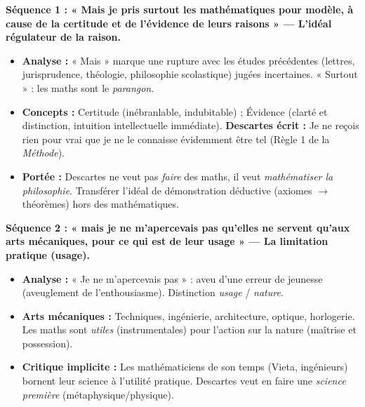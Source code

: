 \documentclass[11pt]{article}
\newcommand{\cle}[1]{{\popxbold\color{popdark}#1}}
\begin{document}
\begin{exoresolu}
    \textbf{Séquence 1 : « Mais je pris surtout les mathématiques pour modèle, à cause de la certitude et de l'évidence de leurs raisons » — L'idéal régulateur de la raison.}
    \begin{itemize}
        \item \textbf{Analyse :} « Mais » marque une rupture avec les études précédentes (lettres, jurisprudence, théologie, philosophie scolastique) jugées incertaines. « Surtout » : les maths sont le \emph{parangon}.
        \item \textbf{Concepts :} \cle{Certitude} (inébranlable, indubitable) ; \cle{Évidence} (clarté et distinction, intuition intellectuelle immédiate). \textbf{Descartes écrit :} \guillemotleft Je ne reçois rien pour vrai que je ne le connaisse évidemment être tel \guillemotright (Règle 1 de la \emph{Méthode}).
        \item \textbf{Portée :} Descartes ne veut pas \emph{faire} des maths, il veut \emph{mathématiser la philosophie}. Transférer l'idéal de démonstration déductive (axiomes $\rightarrow$ théorèmes) hors des mathématiques.
    \end{itemize}

    \textbf{Séquence 2 : « mais je ne m'apercevais pas qu'elles ne servent qu'aux arts mécaniques, pour ce qui est de leur usage » — La limitation pratique (usage).}
    \begin{itemize}
        \item \textbf{Analyse :} « Je ne m'apercevais pas » : aveu d'une erreur de jeunesse (aveuglement de l'enthousiasme). Distinction \emph{usage} / \emph{nature}.
        \item \textbf{Arts mécaniques :} Techniques, ingénierie, architecture, optique, horlogerie. Les maths sont \emph{utiles} (instrumentales) pour l'action sur la nature (maîtrise et possession).
        \item \textbf{Critique implicite :} Les mathématiciens de son temps (Vieta, ingénieurs) bornent leur science à l'utilité pratique. Descartes veut en faire une \emph{science première} (métaphysique/physique).
    \end{itemize}


\end{exoresolu}
\end{document}
